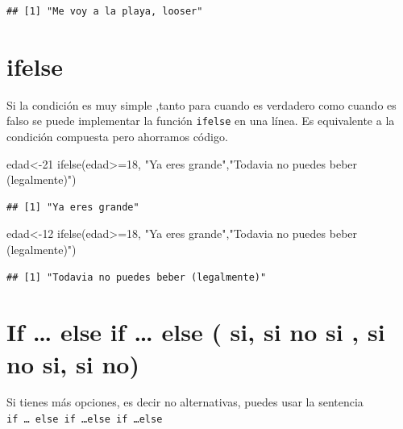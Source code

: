 \documentclass[
]{book}
\newenvironment{Shaded}{\begin{snugshade}}{\end{snugshade}}
\newcommand{\DecValTok}[1]{\textcolor[rgb]{0.00,0.00,0.81}{#1}}
\newcommand{\FunctionTok}[1]{\textcolor[rgb]{0.00,0.00,0.00}{#1}}
\newcommand{\NormalTok}[1]{#1}
\newcommand{\OtherTok}[1]{\textcolor[rgb]{0.56,0.35,0.01}{#1}}
\newcommand{\SpecialCharTok}[1]{\textcolor[rgb]{0.00,0.00,0.00}{#1}}
\newcommand{\StringTok}[1]{\textcolor[rgb]{0.31,0.60,0.02}{#1}}
\begin{document}
\begin{verbatim}
## [1] "Me voy a la playa, looser"
\end{verbatim}

\hypertarget{ifelse}{%
\section{ifelse}\label{ifelse}}

Si la condición es muy simple ,tanto para cuando es verdadero como cuando es falso se puede implementar la función \texttt{ifelse} en una línea. Es equivalente a la condición compuesta pero ahorramos código.

\begin{Shaded}
\begin{Highlighting}[]
\NormalTok{edad}\OtherTok{\textless{}{-}}\DecValTok{21}
\FunctionTok{ifelse}\NormalTok{(edad}\SpecialCharTok{\textgreater{}=}\DecValTok{18}\NormalTok{, }\StringTok{"Ya eres grande"}\NormalTok{,}\StringTok{"Todavia no puedes beber (legalmente)"}\NormalTok{)}
\end{Highlighting}
\end{Shaded}

\begin{verbatim}
## [1] "Ya eres grande"
\end{verbatim}

\begin{Shaded}
\begin{Highlighting}[]
\NormalTok{edad}\OtherTok{\textless{}{-}}\DecValTok{12}
\FunctionTok{ifelse}\NormalTok{(edad}\SpecialCharTok{\textgreater{}=}\DecValTok{18}\NormalTok{, }\StringTok{"Ya eres grande"}\NormalTok{,}\StringTok{"Todavia no puedes beber (legalmente)"}\NormalTok{)}
\end{Highlighting}
\end{Shaded}

\begin{verbatim}
## [1] "Todavia no puedes beber (legalmente)"
\end{verbatim}

\hypertarget{if-else-if-else-si-si-no-si-si-no-si-si-no}{%
\section{If \ldots{} else if \ldots{} else ( si, si no si , si no si, si no)}\label{if-else-if-else-si-si-no-si-si-no-si-si-no}}

Si tienes más opciones, es decir no alternativas, puedes usar la sentencia \texttt{if\ …\ else\ if\ …else\ if\ …else}
\end{document}
